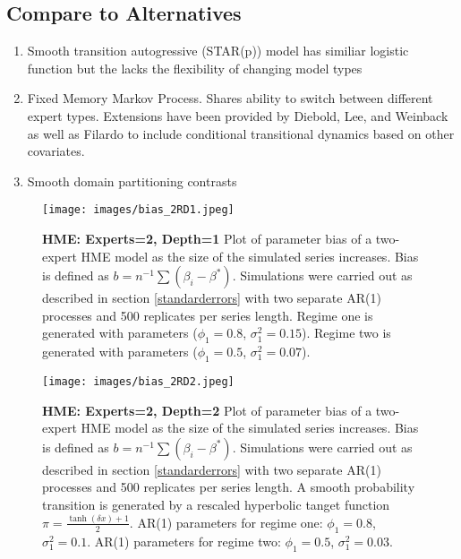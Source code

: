 \documentclass[12pt]{article}
\begin{document}
\subsection{Compare to Alternatives}
\begin{enumerate}
\item Smooth transition autogressive (STAR(p)) model has similiar logistic function but the lacks the flexibility of changing model types
\item Fixed Memory Markov Process. Shares ability to switch between different expert types. Extensions have been provided by Diebold, Lee, and Weinback \cite{DieboldLeeWeinbach1994} as well as Filardo \cite{Filardo1994} to include conditional transitional dynamics based on other covariates.
\item Smooth domain partitioning contrasts
\end{enumerate}
\begin{figure}[ht]
  \centering
  \texttt{[image: images/bias\_2RD1.jpeg]}
  \caption{\textbf{HME: Experts=2, Depth=1} Plot of parameter bias of a two-expert HME model as the size of the simulated series increases. Bias is defined as $b=n^{-1}\textstyle{\sum}(\beta_{i}-\beta^{*})$. Simulations were carried out as described in section \ref{standarderrors} with two separate AR(1) processes and 500 replicates per series length. Regime one is generated with parameters ($\phi_{1}=0.8$, $\sigma^{2}_{1}=0.15$). Regime two is generated with parameters ($\phi_{1}=0.5$, $\sigma^{2}_{1}=0.07$).}
  \label{fig:bias_2RD1}
\end{figure}

\begin{figure}[ht]
  \centering
  \texttt{[image: images/bias\_2RD2.jpeg]}
  \caption{\textbf{HME: Experts=2, Depth=2} Plot of parameter bias of a two-expert HME model as the size of the simulated series increases. Bias is defined as $b=n^{-1}\textstyle{\sum}(\beta_{i}-\beta^{*})$. Simulations were carried out as described in section \ref{standarderrors} with two separate AR(1) processes and 500 replicates per series length. A smooth probability transition is generated by a rescaled hyperbolic tanget function $\pi=\frac{\tanh(\delta x) + 1}{2}$. AR(1) parameters for regime one: $\phi_{1}=0.8$, $\sigma^{2}_{1}=0.1$. AR(1) parameters for regime two: $\phi_{1}=0.5$, $\sigma^{2}_{1}=0.03$.}
  \label{fig:bias_2RD2}
\end{figure}

\printbibliography
\end{document}
